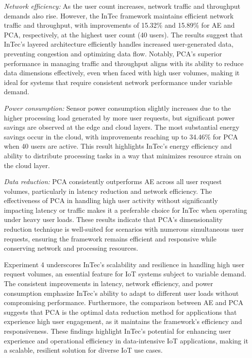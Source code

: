 \documentclass[11pt]{article}
\begin{document}
	\textit{Network efficiency:} As the user count increases, network traffic and throughput
	demands also rise. However, the InTec framework maintains efficient network traffic
	and throughput, with improvements of 15.32\% and 15.89\% for AE and PCA, respectively, at the highest user count (40 users). The results suggest that InTec’s layered
	architecture efficiently handles increased user-generated data, preventing congestion
	and optimizing data flow. Notably, PCA’s superior performance in managing traffic
	and throughput aligns with its ability to reduce data dimensions effectively, even
	when faced with high user volumes, making it ideal for systems that require consistent network performance under variable demand.
	
	\textit{Power consumption:} Sensor power consumption slightly increases due to the
	higher processing load generated by more user requests, but significant power savings are observed at the edge and cloud layers. The most substantial energy savings
	occur in the cloud, with improvements reaching up to 34.46\% for PCA when 40
	users are active. This result highlights InTec’s energy efficiency and ability to distribute processing tasks in a way that minimizes resource strain on the cloud layer.
	
	\textit{Data reduction:} PCA consistently outperforms AE across all user request volumes, particularly in latency reduction and network efficiency. The effectiveness of
	PCA in handling high user activity without significantly impacting latency or traffic
	makes it a preferable choice for InTec when operating under heavy user loads. These
	results indicate that PCA’s dimensionality reduction technique is well-suited for scenarios with numerous simultaneous user requests, ensuring the framework remains
	efficient and responsive while conserving network and processing resources.
	
	Experiment 4 underscores InTec’s scalability and resilience in handling high user
	request volumes, an essential feature for IoT systems subject to variable demand.
	The consistent improvements in latency, network efficiency, and power consumption emphasize InTec’s ability to adapt to different user loads without compromising performance. Furthermore, the comparison between AE and PCA suggests that
	PCA is the optimal data reduction method for applications that experience high user
	engagement, as it maintains the framework’s efficiency and responsiveness. These
	findings highlight InTec’s potential for enhancing user experience and operational
	efficiency in data-intensive IoT applications, making it a scalable, resilient solution
	for diverse IoT use cases.
	
\end{document}
